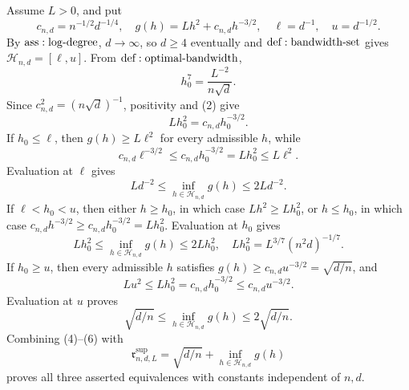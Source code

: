 Assume \(L>0\), and put
\[
 c_{n,d}=n^{-1/2}d^{-1/4},\quad
 g(h)=Lh^2+c_{n,d}h^{-3/2},\quad
 \ell=d^{-1},\quad u=d^{-1/2}.
\tag{1}
\]
By \({\rm ass:log\text{-}degree}\), \(d\to\infty\), so \(d\geq4\) eventually and \({\rm def:bandwidth\text{-}set}\) gives \(\mathcal H_{n,d}=[\ell,u]\).  From \({\rm def:optimal\text{-}bandwidth}\),
\[
 h_0^7=\frac{L^{-2}}{n\sqrt d}.
\tag{2}
\]
Since \(c_{n,d}^2=(n\sqrt d)^{-1}\), positivity and (2) give
\[
 Lh_0^2=c_{n,d}h_0^{-3/2}.
\tag{3}
\]
If \(h_0\leq\ell\), then \(g(h)\geq L\ell^2\) for every admissible \(h\), while
\[
 c_{n,d}\ell^{-3/2}\leq c_{n,d}h_0^{-3/2}
 =Lh_0^2\leq L\ell^2.
\]
Evaluation at \(\ell\) gives
\[
 Ld^{-2}\leq\inf_{h\in\mathcal H_{n,d}}g(h)\leq2Ld^{-2}.
\tag{4}
\]
If \(\ell<h_0<u\), then either \(h\geq h_0\), in which case \(Lh^2\geq Lh_0^2\), or \(h\leq h_0\), in which case \(c_{n,d}h^{-3/2}\geq c_{n,d}h_0^{-3/2}=Lh_0^2\).  Evaluation at \(h_0\) gives
\[
 Lh_0^2\leq\inf_{h\in\mathcal H_{n,d}}g(h)\leq2Lh_0^2,
 \quad Lh_0^2=L^{3/7}(n^2d)^{-1/7}.
\tag{5}
\]
If \(h_0\geq u\), then every admissible \(h\) satisfies \(g(h)\geq c_{n,d}u^{-3/2}=\sqrt{d/n}\), and
\[
 Lu^2\leq Lh_0^2=c_{n,d}h_0^{-3/2}
 \leq c_{n,d}u^{-3/2}.
\]
Evaluation at \(u\) proves
\[
 \sqrt{d/n}\leq\inf_{h\in\mathcal H_{n,d}}g(h)
 \leq2\sqrt{d/n}.
\tag{6}
\]
Combining (4)--(6) with
\[
 \mathfrak r^{\mathrm{sup}}_{n,d,L}
 =\sqrt{d/n}+\inf_{h\in\mathcal H_{n,d}}g(h)
\tag{7}
\]
proves all three asserted equivalences with constants independent of \(n,d\).


